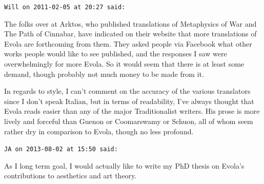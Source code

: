 \begin{footnotesize}
\begin{sffamily}
\hfill

\texttt{Will on 2011-02-05 at 20:27 said:}

The folks over at Arktos, who published translations of Metaphysics of War and The Path of Cinnabar, have indicated on their website that more translations of Evola are forthcoming from them. They asked people via Facebook what other works people would like to see published, and the responses I saw were overwhelmingly for more Evola. So it would seem that there is at least some demand, though probably not much money to be made from it.

In regards to style, I can't comment on the accuracy of the various translators since I don't speak Italian, but in terms of readability, I've always thought that Evola reads easier than any of the major Traditionalist writers. His prose is more lively and forceful than Guenon or Coomarswamy or Schuon, all of whom seem rather dry in comparison to Evola, though no less profound.

\hfill

\texttt{JA on 2013-08-02 at 15:50 said:}

As I long term goal, I would actually like to write my PhD thesis on Evola's contributions to aesthetics and art theory.


\hfill

\end{sffamily}
\end{footnotesize}


